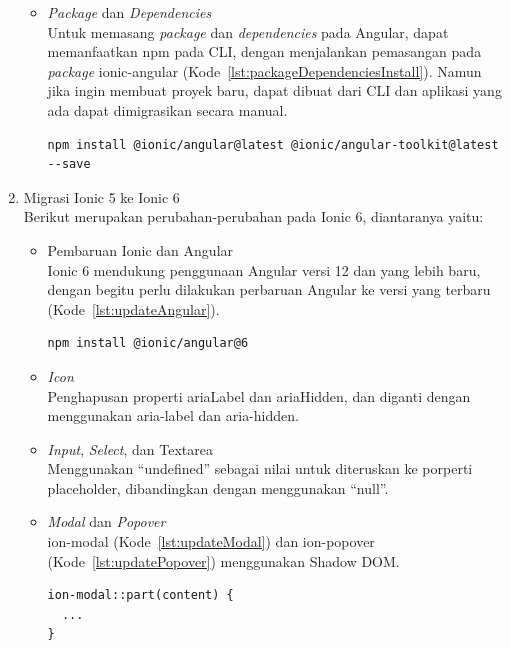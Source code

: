 \begin{enumerate}
\begin{itemize}
		\item {\it Package} dan {\it Dependencies} \\
		Untuk memasang {\it package} dan {\it dependencies} pada Angular, dapat memanfaatkan npm pada CLI, dengan menjalankan pemasangan pada {\it package} ionic-angular  (Kode~\ref{lst:packageDependenciesInstall}). Namun jika ingin membuat proyek baru, dapat dibuat dari CLI dan aplikasi yang ada dapat dimigrasikan secara manual.
		\begin{lstlisting}[label={lst:packageDependenciesInstall}, caption=Kode untuk Memasang {\it Package} dan {\it Dependencies} pada Angular]
npm install @ionic/angular@latest @ionic/angular-toolkit@latest --save
		\end{lstlisting} 
	\end{itemize}
	\item Migrasi Ionic 5 ke Ionic 6 \\
	Berikut merupakan perubahan-perubahan pada Ionic 6, diantaranya yaitu:
	\begin{itemize}
		\item Pembaruan Ionic dan Angular \\
		Ionic 6 mendukung penggunaan Angular versi 12 dan yang lebih baru, dengan begitu perlu dilakukan perbaruan Angular ke versi yang terbaru (Kode~\ref{lst:updateAngular}).
		
\begin{lstlisting}[label={lst:updateAngular}, caption=Kode untuk Memperbarui Versi Ionic 6 dengan versi Angular Terbaru]
npm install @ionic/angular@6
\end{lstlisting} 

		\item \textit{Icon} \\
		Penghapusan properti ariaLabel dan ariaHidden, dan diganti dengan menggunakan aria-label dan aria-hidden.
		\item \textit{Input}, \textit{Select}, dan Textarea \\
		Menggunakan ``undefined'' sebagai nilai untuk diteruskan ke porperti placeholder, dibandingkan dengan menggunakan ``null''.	
		
		\item \textit{Modal} dan \textit{Popover} \\
		ion-modal (Kode~\ref{lst:updateModal}) dan ion-popover (Kode~\ref{lst:updatePopover}) menggunakan Shadow DOM.
		
\begin{lstlisting}[label={lst:updateModal}, caption=Kode ion-modal menggunakan Shadow DOM pada CSS]
ion-modal::part(content) {
  ...
}


\end{lstlisting}
\end{itemize}
\end{enumerate}
